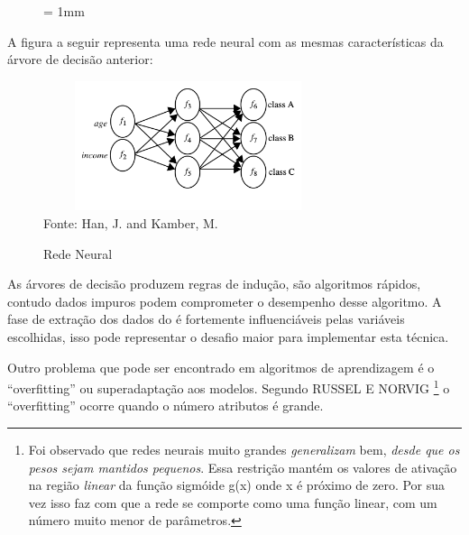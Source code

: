 \vspace{2cm}

\begin{figure}[ht] \unitlength= 1mm \thicklines
\end{figure}

\vspace{3cm} 

A figura a seguir representa uma rede neural com as mesmas características da árvore de decisão anterior:
\begin{figure}[!ht]
	\centering
	\caption{Rede Neural}
	\includegraphics[width=85mm, height=38mm]{Figuras/BigData/redeneural.png}\\
	\tiny Fonte: Han, J. and Kamber, M. 
\end{figure}  

As árvores de decisão produzem regras de indução, são algoritmos rápidos, contudo dados impuros podem comprometer o desempenho desse algoritmo. 
A fase de extração dos dados do é fortemente influenciáveis pelas variáveis escolhidas, \cite{DecisionTree} 
isso pode representar o desafio maior para implementar esta técnica. 

Outro problema que pode ser encontrado em algoritmos de aprendizagem é o ``overfitting'' ou superadaptação aos modelos.
Segundo RUSSEL E NORVIG \cite{NorvigRussel2004}  \footnote{Foi observado que redes neurais muito grandes \textit{generalizam} bem, 
\textit{desde que os pesos sejam mantidos pequenos}. Essa restrição mantém os valores de ativação na região 
\textit{linear} da função sigmóide g(x) onde x é próximo de zero. Por sua vez isso faz com que a rede se comporte 
como uma função linear, com um número muito menor de parâmetros.} o ``overfitting'' ocorre quando o número atributos é grande.


